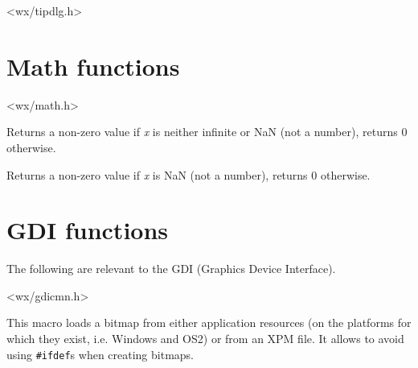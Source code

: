 




<wx/tipdlg.h>




\section{Math functions}\label{mathfunctions}


<wx/math.h>


\label{wxfinite}


Returns a non-zero value if {\it x} is neither infinite or NaN (not a number),
returns 0 otherwise.


\label{wxisnan}


Returns a non-zero value if {\it x} is NaN (not a number), returns 0
otherwise.




\section{GDI functions}\label{gdifunctions}

The following are relevant to the GDI (Graphics Device Interface).


<wx/gdicmn.h>


\label{wxbitmapmacro}


This macro loads a bitmap from either application resources (on the platforms
for which they exist, i.e. Windows and OS2) or from an XPM file. It allows to
avoid using {\tt \#ifdef}s when creating bitmaps.

